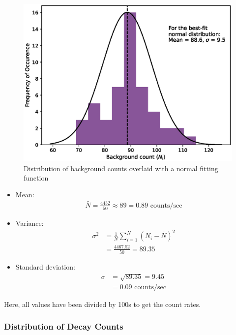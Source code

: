 \begin{figure}
    \centering
    \includegraphics[width=1\columnwidth]{images/gauss-bg.eps}
    \caption{Distribution of background counts overlaid with a normal fitting function}
    \label{g7}
\end{figure}

\begin{itemize}
    \item Mean: \begin{align*}
        \bar{N} = \frac{4432}{50} \approx 89 = 0.89 \text{ counts/sec}
    \end{align*}
    \item Variance: \begin{align*}
        \sigma^2 &= \frac{1}{N}\sum^N_{i=1}(N_i-\bar{N})^2 \\ &= \frac{4467.52}{50} = 89.35
    \end{align*}
    \item Standard deviation: \begin{align*}
        \sigma &= \sqrt{89.35} = 9.45\\
        &= 0.09 \text{ counts/sec}
    \end{align*}
\end{itemize}

Here, all values have been divided by 100s to get the count rates.

\subsubsection{Distribution of Decay Counts}

